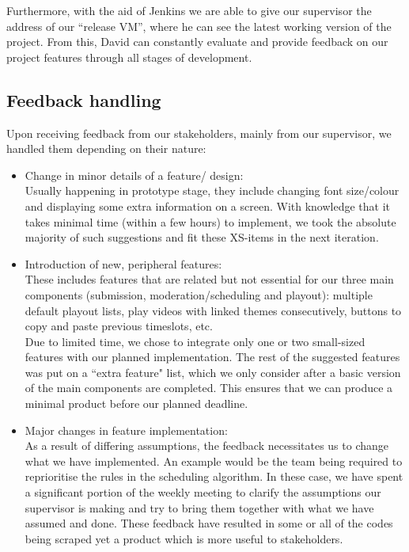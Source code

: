\documentclass[a4paper]{article}
\begin{document}
Furthermore, with the aid of Jenkins we are able to give our supervisor
the address of our ``release VM'', where he can see the latest working 
version of the project. From this, David can constantly evaluate
and provide feedback on our project features through all stages of development.

\subsection{Feedback handling}
Upon receiving feedback from our stakeholders, mainly from our supervisor,
we handled them depending on their nature:

\begin{itemize}
  \item Change in minor details of a feature/ design: \\
        Usually happening in prototype stage, they include changing font
        size/colour and displaying some extra information on a screen.
        With knowledge that it takes minimal time (within a few hours) 
        to implement, we took the absolute majority of such suggestions
        and fit these XS-items in the next iteration.
  \item Introduction of new, peripheral features: \\
        These includes features that are related but not essential for our
        three main components (submission, moderation/scheduling and playout):
        multiple default playout lists, play videos with 
        linked themes consecutively, buttons to copy and paste previous
        timeslots, etc. \\
        Due to limited time, we chose to integrate only
        one or two small-sized features with our planned implementation.
        The rest of the suggested features was put on a ``extra feature" list,
        which we only consider after a basic version of the main components
        are completed. This ensures that we can produce a minimal
        product before our planned deadline.
  \item Major changes in feature implementation: \\
        As a result of differing assumptions, the feedback necessitates us to
        change what we have implemented. An example would be the team being 
        required to reprioritise the rules in the scheduling algorithm. 
        In these case, we have spent a significant portion of the weekly
        meeting to clarify the assumptions our supervisor is making and try 
        to bring them together with what we have assumed and done.
        These feedback have resulted in some or all of the codes
        being scraped yet a product which is more useful to stakeholders.

\end{itemize}
\end{document}
